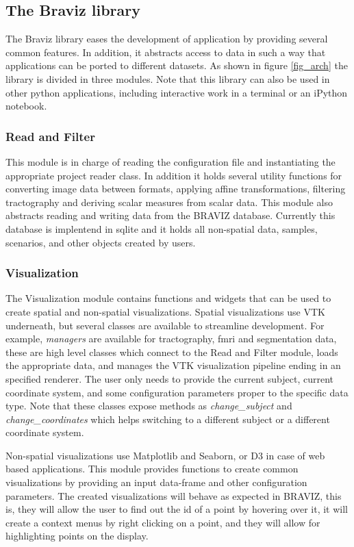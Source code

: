 \documentclass[twocolumn]{svjour3}
\begin{document}
\subsection{The Braviz library}

The Braviz library eases the development of application by providing several common features. In addition, it abstracts access to data in such a way that applications can be ported to different datasets. As shown in figure \ref{fig_arch} the library is divided in three modules. Note that this library can also be used in other python applications, including interactive work in a terminal or an iPython notebook.

\subsubsection{Read and Filter}

This module is in charge of reading the configuration file and instantiating the appropriate project reader class. In addition it holds several utility functions for converting image data between formats, applying affine transformations, filtering tractography and deriving scalar measures from scalar data. This module also abstracts reading and writing data from the BRAVIZ database. Currently this database is implentend in sqlite and it holds all non-spatial data, samples, scenarios, and other objects created by users.

\subsubsection{Visualization}

The Visualization module contains functions and widgets that can be used to create spatial and non-spatial visualizations. Spatial visualizations use VTK underneath, but several classes are available to streamline development. For example, \emph{managers} are available for tractography, fmri and segmentation data, these are high level classes which connect to the Read and Filter module, loads the appropriate data, and manages the VTK visualization pipeline ending in an specified renderer. The user only needs to provide the current subject, current coordinate system, and some configuration parameters proper to the specific data type. Note that these classes expose methods as \emph{change\_subject} and \emph{change\_coordinates} which helps switching to a different subject or a different coordinate system.

Non-spatial visualizations use Matplotlib and Seaborn, or D3 in case of web based applications. This module provides functions to create common visualizations by providing an input data-frame and other configuration parameters. The created visualizations will behave as expected in BRAVIZ, this is, they will allow the user to find out the id of a point by hovering over it, it will create a context menus by right clicking on a point, and they will allow for highlighting points on the display. 
\end{document}
